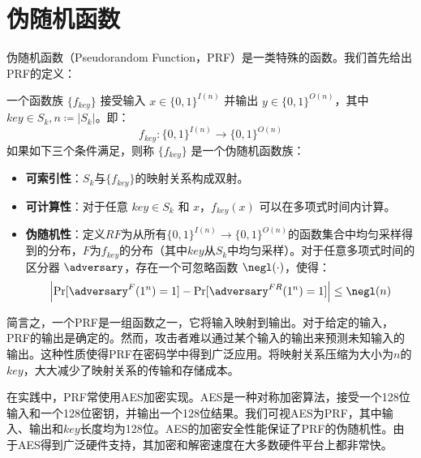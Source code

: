 \section{伪随机函数}
伪随机函数（Pseudorandom Function，PRF）是一类特殊的函数。我们首先给出PRF的定义\cite{GolGolMic86}：
\begin{definition}[伪随机函数族]
    一个函数族 $\{f_{key}\}$ 接受输入 $x\in\{0,1\}^{I(n)}$ 并输出 $y\in\{0,1\}^{O(n)}$，其中 $key\in S_k, n \coloneqq |S_k|$。即：
    $$ f_{key}: \{0,1\}^{I(n)} \rightarrow \{0,1\}^{O(n)}$$
    如果如下三个条件满足，则称 $\{f_{key}\}$ 是一个伪随机函数族：
    \begin{itemize}
        \item \textbf{可索引性}：$S_k$与$\{f_{key}\}$的映射关系构成双射。
        \item \textbf{可计算性}：对于任意 $key\in S_k$ 和 $x$，$f_{key}(x)$ 可以在多项式时间内计算。
        \item \textbf{伪随机性}：定义$RF$为从所有$\{0,1\}^{I(n)} \rightarrow \{0,1\}^{O(n)}$的函数集合中均匀采样得到的分布，$F$为$f_{key}$的分布（其中$key$从$S_k$中均匀采样）。对于任意多项式时间的区分器 $\adversary$，存在一个可忽略函数 $\negl(\cdot)$，使得：
        $$\left| \Pr[\adversary^{F}(1^n) = 1] - \Pr[\adversary^{FR}(1^n) = 1] \right| \le \negl(n)$$
    \end{itemize}
\end{definition}

简言之，一个PRF是一组函数之一，它将输入映射到输出。对于给定的输入，PRF的输出是确定的。然而，攻击者难以通过某个输入的输出来预测未知输入的输出。这种性质使得PRF在密码学中得到广泛应用。将映射关系压缩为大小为$n$的$key$，大大减少了映射关系的传输和存储成本。

在实践中，PRF常使用AES加密\cite{1250456}实现。AES是一种对称加密算法，接受一个128位输入和一个128位密钥，并输出一个128位结果。我们可视AES为PRF，其中输入、输出和$key$长度均为128位。AES的加密安全性能保证了PRF的伪随机性。由于AES得到广泛硬件支持\cite{1190589}，其加密和解密速度在大多数硬件平台上都非常快。